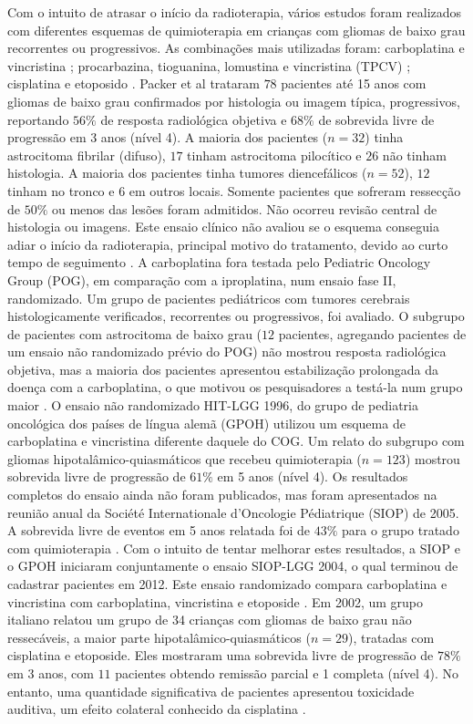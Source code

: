 \documentclass[11pt,a4paper,oldfontcommands]{memoir}
\begin{document}
Com o intuito de atrasar o início da radioterapia, vários estudos foram realizados com diferentes esquemas de quimioterapia em crianças com gliomas de baixo grau recorrentes ou progressivos. As combinações mais utilizadas foram: carboplatina e vincristina \cite{packer,gnekow}; procarbazina, tioguanina, lomustina e vincristina (TPCV) \cite{prados}; cisplatina e etoposido \cite{mass}. Packer et al trataram \(78\) pacientes até 15 anos com gliomas de baixo grau confirmados por histologia ou imagem típica, progressivos, reportando \(56\%\) de resposta radiológica objetiva e \(68\%\) de sobrevida livre de progressão em 3 anos (nível 4). A maioria dos pacientes (\(n=32\)) tinha astrocitoma fibrilar (difuso), \(17\) tinham astrocitoma pilocítico e \(26\) não tinham histologia. A maioria dos pacientes tinha tumores diencefálicos (\(n=52\)), \(12\) tinham no tronco e 6 em outros locais. Somente pacientes que sofreram ressecção de \(50\%\) ou menos das lesões foram admitidos. Não ocorreu revisão central de histologia ou imagens. Este ensaio clínico não avaliou se o esquema conseguia adiar o início da radioterapia, principal motivo do tratamento, devido ao curto tempo de seguimento \cite{packer}. A carboplatina fora testada pelo Pediatric Oncology Group (POG), em comparação com a iproplatina, num ensaio fase II, randomizado. Um grupo de pacientes pediátricos com tumores cerebrais histologicamente verificados, recorrentes ou progressivos, foi avaliado. O subgrupo de pacientes com astrocitoma de baixo grau (\(12\) pacientes, agregando pacientes de um ensaio não randomizado prévio do POG) não mostrou resposta radiológica objetiva, mas a maioria dos pacientes apresentou estabilização prolongada da doença com a carboplatina, o que motivou os pesquisadores a testá-la num grupo maior \cite{fried}. O ensaio não randomizado HIT-LGG 1996, do grupo de pediatria oncológica dos países de língua alemã (GPOH) utilizou um esquema de carboplatina e vincristina diferente daquele do COG. Um relato do subgrupo com gliomas hipotalâmico-quiasmáticos que recebeu quimioterapia (\(n=123\)) mostrou sobrevida livre de progressão de \(61\%\) em 5 anos \cite{gnekow} (nível 4). Os resultados completos do ensaio ainda não foram publicados, mas foram apresentados na reunião anual da Société Internationale d’Oncologie Pédiatrique (SIOP) de 2005. A sobrevida livre de eventos em 5 anos relatada foi de \(43\%\) para o grupo tratado com quimioterapia \cite{gnekow2}. Com o intuito de tentar melhorar estes resultados, a SIOP e o GPOH iniciaram conjuntamente o ensaio SIOP-LGG 2004, o qual terminou de cadastrar pacientes em 2012. Este ensaio randomizado compara carboplatina e vincristina com carboplatina, vincristina e etoposide \cite{gnekow3}. Em 2002, um grupo italiano relatou um grupo de 34 crianças com gliomas de baixo grau não ressecáveis, a maior parte hipotalâmico-quiasmáticos (\(n=29\)), tratadas com cisplatina e etoposide. Eles mostraram uma sobrevida livre de progressão de \(78\%\) em 3 anos, com \(11\) pacientes obtendo remissão parcial e 1 completa (nível 4). No entanto, uma quantidade significativa de pacientes apresentou toxicidade auditiva, um efeito colateral conhecido da cisplatina \cite{mass}.
\end{document}
